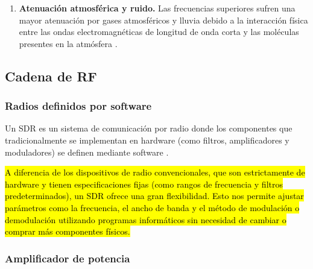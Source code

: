 \documentclass[12pt,a4paper]{article}
\begin{document}
\begin{enumerate}
Para mantener una ganancia constante, si se aumenta la frecuencia (reduciendo la longitud de onda), el área efectiva necesaria disminuye drásticamente. El aumento de la ganancia mediante el incremento de la frecuencia o del área efectiva resulta en un ancho de haz más estrecho. Esto exige una precisión de apuntamiento mucho mayor hacia la estación terrestre para no perder el enlace \cite{ref39}. 

En el caso de las antenas omnidireccionales, su área efectiva es inherentemente pequeña y depende principalmente del cuadrado de la longitud de onda, lo que las hace muy dependientes de la frecuencia para cerrar el enlace \cite{ref39,ref40}

\item \textbf{Atenuación atmosférica y ruido.} Las frecuencias superiores sufren una mayor atenuación por gases atmosféricos y lluvia debido a la interacción física entre las ondas electromagnéticas de longitud de onda corta y las moléculas presentes en la atmósfera \cite{ref40}. 
\end{enumerate}

\subsection{Cadena de RF}\label{componentes-rf}

\subsubsection{Radios definidos por software}\label{radios-definidos-por-software}

Un SDR es un sistema de comunicación por radio donde los componentes que tradicionalmente se implementan en hardware (como filtros, amplificadores y moduladores) se definen mediante software \cite{ref49}.

\hl{A diferencia de los dispositivos de radio convencionales, que son estrictamente de hardware y tienen especificaciones fijas (como rangos de frecuencia y filtros predeterminados), un SDR ofrece una gran flexibilidad. Esto nos permite ajustar parámetros como la frecuencia, el ancho de banda y el método de modulación o demodulación utilizando programas informáticos sin necesidad de cambiar o comprar más componentes físicos.}

\subsubsection{Amplificador de potencia}\label{amplificador-de-potencia}
\end{document}

